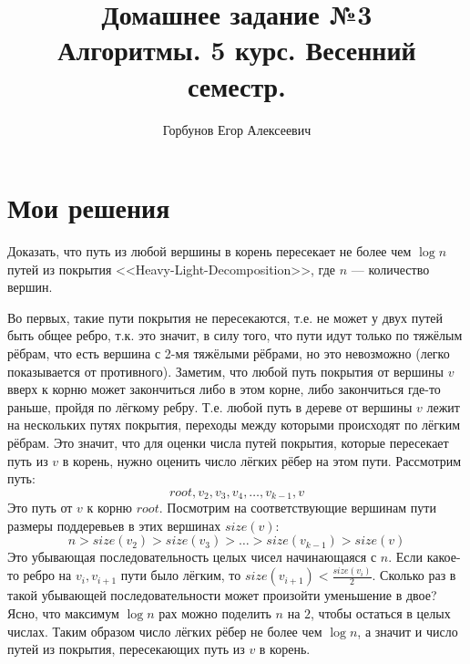
\title{Домашнее задание №3 \\ Алгоритмы. 5 курс. Весенний семестр.}
\author{Горбунов Егор Алексеевич}


\maketitle

\section{Мои решения}

\begin{task}[1]
	Доказать, что путь из любой вершины в корень пересекает не более чем $\log{n}$ путей из покрытия <<Heavy-Light-Decomposition>>, где $n$ --- количество вершин.
\end{task}
\begin{solution}
	Во первых, такие пути покрытия не пересекаются, т.е. не может у двух путей быть общее ребро, т.к. это значит, в силу того, что пути идут только по тяжёлым рёбрам, что есть вершина с 2-мя тяжёлыми рёбрами, но это невозможно (легко показывается от противного).
	Заметим, что любой путь покрытия от вершины $v$ вверх к корню может закончиться либо в этом корне, либо закончиться где-то раньше, пройдя по лёгкому ребру. Т.е. любой путь в дереве от вершины $v$ лежит на нескольких путях покрытия, переходы между которыми происходят по лёгким рёбрам. Это значит, что для оценки числа путей покрытия, которые пересекает путь из $v$ в корень, нужно оценить число лёгких рёбер на этом пути. Рассмотрим путь:
	\[
		root, v_2, v_3, v_4, \ldots, v_{k-1}, v
	\]
	Это путь от $v$ к корню $root$. Посмотрим на соответствующие вершинам пути размеры поддеревьев в этих вершинах $size(v)$:
	\[
		n > size(v_2) > size(v_3) > \ldots > size(v_{k-1}) > size(v)
	\]
	Это убывающая последовательность целых чисел начинающаяся с $n$. Если какое-то ребро на $v_i,v_{i+1}$ пути было лёгким, то $size(v_{i+1}) < \frac{size(v_{i})}{2}$. Сколько раз в такой убывающей последовательности может произойти уменьшение в двое? Ясно, что максимум $\log{n}$ рах можно поделить $n$ на $2$, чтобы остаться в целых числах. Таким образом число лёгких рёбер не более чем $\log{n}$, а значит и число путей из покрытия, пересекающих путь из $v$ в корень. \xqed
\end{solution}

